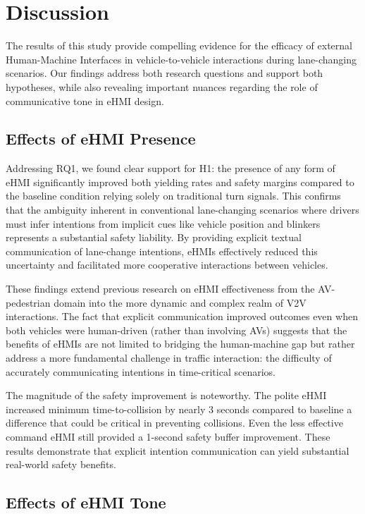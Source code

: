 \documentclass[manuscript,review]{acmart}
\begin{document}
\section{Discussion}

The results of this study provide compelling evidence for the efficacy of external Human-Machine Interfaces in vehicle-to-vehicle interactions during lane-changing scenarios. Our findings address both research questions and support both hypotheses, while also revealing important nuances regarding the role of communicative tone in eHMI design.

\subsection{Effects of eHMI Presence}

Addressing RQ1, we found clear support for H1: the presence of any form of eHMI significantly improved both yielding rates and safety margins compared to the baseline condition relying solely on traditional turn signals. This confirms that the ambiguity inherent in conventional lane-changing scenarios where drivers must infer intentions from implicit cues like vehicle position and blinkers represents a substantial safety liability. By providing explicit textual communication of lane-change intentions, eHMIs effectively reduced this uncertainty and facilitated more cooperative interactions between vehicles.

These findings extend previous research on eHMI effectiveness from the AV-pedestrian domain \cite{habibovic2018communicating, colley2021investigating} into the more dynamic and complex realm of V2V interactions. The fact that explicit communication improved outcomes even when both vehicles were human-driven (rather than involving AVs) suggests that the benefits of eHMIs are not limited to bridging the human-machine gap but rather address a more fundamental challenge in traffic interaction: the difficulty of accurately communicating intentions in time-critical scenarios.

The magnitude of the safety improvement is noteworthy. The polite eHMI increased minimum time-to-collision by nearly 3 seconds compared to baseline a difference that could be critical in preventing collisions. Even the less effective command eHMI still provided a 1-second safety buffer improvement. These results demonstrate that explicit intention communication can yield substantial real-world safety benefits.

\subsection{Effects of eHMI Tone}
\end{document}
